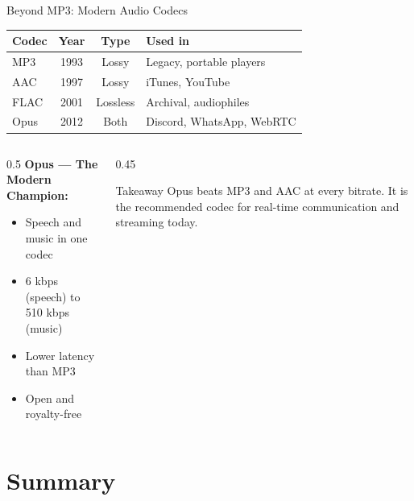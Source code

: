 \documentclass[aspectratio=169,12pt]{beamer}
\begin{document}
\begin{frame}{Beyond MP3: Modern Audio Codecs}
    \begin{center}
        \small
        \begin{tabular}{l|c|c|l}
            \toprule
            \textbf{Codec} & \textbf{Year} & \textbf{Type} & \textbf{Used in} \\
            \midrule
            MP3 & 1993 & Lossy & Legacy, portable players \\
            AAC & 1997 & Lossy & iTunes, YouTube \\
            FLAC & 2001 & Lossless & Archival, audiophiles \\
            Opus & 2012 & Both & Discord, WhatsApp, WebRTC \\
            \bottomrule
        \end{tabular}
    \end{center}
    
    \vspace{0.2cm}
    \begin{columns}
        \begin{column}{0.5\textwidth}
            \textbf{Opus --- The Modern Champion:}
            \begin{itemize}
                \item Speech and music in one codec
                \item 6 kbps (speech) to 510 kbps (music)
                \item Lower latency than MP3
                \item Open and royalty-free
            \end{itemize}
        \end{column}
        \begin{column}{0.45\textwidth}
            \begin{block}{Takeaway}
                Opus beats MP3 and AAC at every bitrate. It is the recommended codec for real-time communication and streaming today.
            \end{block}
        \end{column}
    \end{columns}
\end{frame}

\section{Summary}
\end{document}
